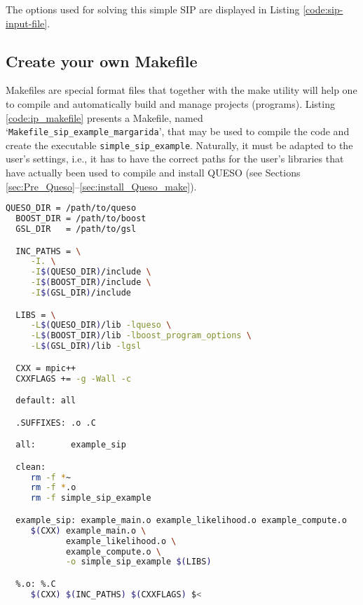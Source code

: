 The options used for solving this simple SIP are displayed in Listing \ref{code:sip-input-file}.





\subsection{Create your own Makefile}\label{sec:sip-makefile}

Makefiles are special format files that together with the make utility will help one to compile and automatically build and manage projects (programs).  
Listing \ref{code:ip_makefile} presents a Makefile, named `\texttt{Makefile\_sip\_example\_margarida}', that may be used to compile the code and create the executable \verb+simple_sip_example+. Naturally, it must be adapted to the user's settings, i.e., it has to have the correct paths for the user's libraries that have actually been used to compile and install QUESO  (see Sections \ref{sec:Pre_Queso}--\ref{sec:install_Queso_make}).

\begin{lstlisting}[caption={Makefile for the application code in Listings
  \ref{code:sip-main-c}-\ref{code:sip-compute-c}},
  language=bash,
  label={code:ip_makefile}]
  QUESO_DIR = /path/to/queso
  BOOST_DIR = /path/to/boost
  GSL_DIR   = /path/to/gsl

  INC_PATHS = \
     -I. \
     -I$(QUESO_DIR)/include \
     -I$(BOOST_DIR)/include \
     -I$(GSL_DIR)/include

  LIBS = \
     -L$(QUESO_DIR)/lib -lqueso \
     -L$(BOOST_DIR)/lib -lboost_program_options \
     -L$(GSL_DIR)/lib -lgsl

  CXX = mpic++
  CXXFLAGS += -g -Wall -c

  default: all

  .SUFFIXES: .o .C

  all:       example_sip

  clean:
     rm -f *~
     rm -f *.o
     rm -f simple_sip_example

  example_sip: example_main.o example_likelihood.o example_compute.o
     $(CXX) example_main.o \
            example_likelihood.o \
            example_compute.o \
            -o simple_sip_example $(LIBS)

  %.o: %.C
     $(CXX) $(INC_PATHS) $(CXXFLAGS) $<
\end{lstlisting}

